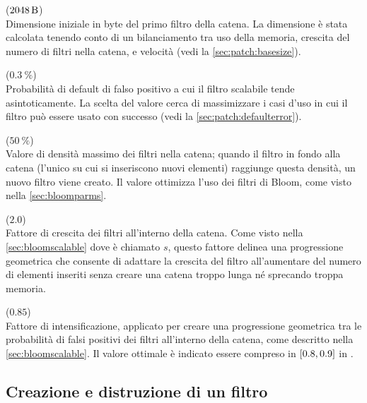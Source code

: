 \begin{description}[font={\bfseries\ttfamily}]

  \item[CONFIG\_BLOOM\_BASESIZE] ($\SI{2048}{\byte}$) \\ Dimensione iniziale in byte del primo
  filtro della catena. La dimensione è stata calcolata tenendo conto di un bilanciamento tra uso
  della memoria, crescita del numero di filtri nella catena, e velocità (vedi la
  \autoref{sec:patch:basesize}).

  \item[CONFIG\_BLOOM\_DEFAULTERROR] ($\SI{0.3}{\percent}$) \\ Probabilità di default di falso
  positivo a cui il filtro scalabile tende asintoticamente. La scelta del valore cerca di
  massimizzare i casi d'uso in cui il filtro può essere usato con successo (vedi la
  \autoref{sec:patch:defaulterror}).

  \item[CONFIG\_BLOOM\_DESIREDFILLRATIO] ($\SI{50}{\percent}$) \\ Valore di densità massimo dei
  filtri nella catena; quando il filtro in fondo alla catena (l'unico su cui si inseriscono nuovi
  elementi) raggiunge questa densità, un nuovo filtro viene creato. Il valore ottimizza l'uso dei
  filtri di Bloom, come visto nella \autoref{sec:bloomparms}.

  \item[CONFIG\_BLOOM\_ITEMGROWTHRATIO] ($\num{2.0}$) \\ Fattore di crescita dei filtri
  all'interno della catena. Come visto nella \autoref{sec:bloomscalable} dove è chiamato
  $s$, questo fattore delinea una progressione geometrica che consente di adattare la crescita del
  filtro all'aumentare del numero di elementi inseriti senza creare una catena troppo lunga
  né sprecando troppa memoria.

  \item[CONFIG\_BLOOM\_TIGHTENINGRATIO] ($\num{0.85}$) \\ Fattore di intensificazione, applicato
  per creare una progressione geometrica tra le probabilità di falsi positivi dei filtri all'interno
  della catena, come descritto nella \autoref{sec:bloomscalable}. Il valore ottimale è indicato
  essere compreso in $\interval{0.8}{0.9}$ in \cite{bloom-scalable}.

\end{description}

\subsection{Creazione e distruzione di un filtro}

